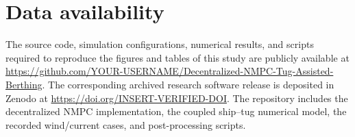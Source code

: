 \section*{Data availability}
The source code, simulation configurations, numerical results, and scripts required to reproduce the figures and tables of this study are publicly available at \url{https://github.com/YOUR-USERNAME/Decentralized-NMPC-Tug-Assisted-Berthing}. The corresponding archived research software release is deposited in Zenodo at \url{https://doi.org/INSERT-VERIFIED-DOI}. The repository includes the decentralized NMPC implementation, the coupled ship--tug numerical model, the recorded wind/current cases, and post-processing scripts.
